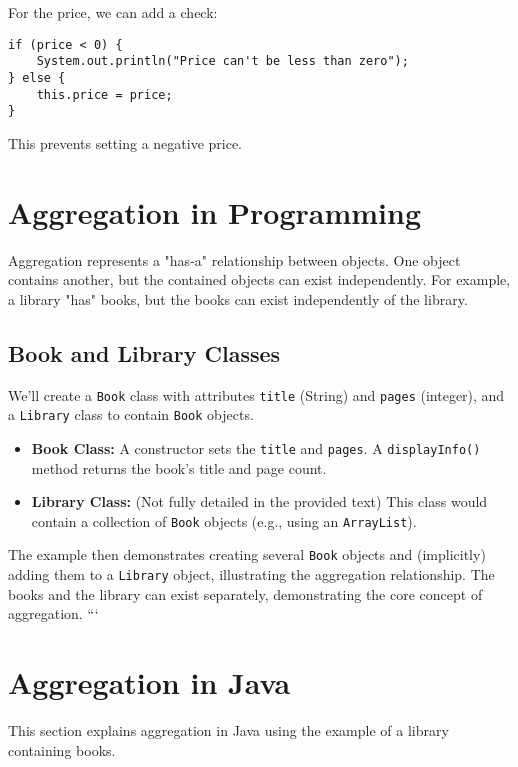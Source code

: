 \documentclass{article}
\begin{document}
For the price, we can add a check:

\begin{verbatim}
if (price < 0) {
    System.out.println("Price can't be less than zero");
} else {
    this.price = price;
}
\end{verbatim}

This prevents setting a negative price.


\section{Aggregation in Programming}

Aggregation represents a "has-a" relationship between objects. One object contains another, but the contained objects can exist independently.  For example, a library "has" books, but the books can exist independently of the library.

\subsection{Book and Library Classes}

We'll create a \texttt{Book} class with attributes \texttt{title} (String) and \texttt{pages} (integer), and a \texttt{Library} class to contain \texttt{Book} objects.

\begin{itemize}
    \item \textbf{Book Class:}  A constructor sets the \texttt{title} and \texttt{pages}. A \texttt{displayInfo()} method returns the book's title and page count.
    \item \textbf{Library Class:} (Not fully detailed in the provided text) This class would contain a collection of \texttt{Book} objects (e.g., using an \texttt{ArrayList}).
\end{itemize}

The example then demonstrates creating several \texttt{Book} objects and (implicitly) adding them to a \texttt{Library} object, illustrating the aggregation relationship.  The books and the library can exist separately, demonstrating the core concept of aggregation.
```


\section{Aggregation in Java}

This section explains aggregation in Java using the example of a library containing books.
\end{document}
